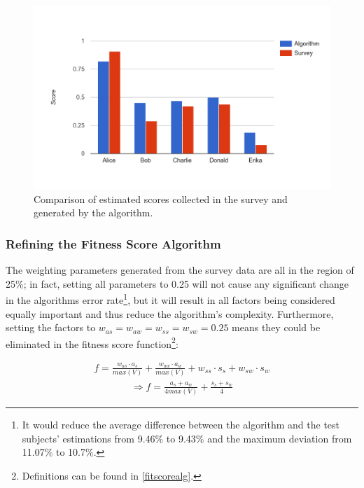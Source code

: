 \begin{figure}[!htp]
    \centering
    \includegraphics[width=\textwidth]{images/survey_vs_alg.png}
    \caption[Diagram: Comparison of Survey and Algorithm]{Comparison of estimated scores collected in the survey and generated by the algorithm.}
    \label{survey:compare}
\end{figure}


\newpage

\subsubsection{Refining the Fitness Score Algorithm}
The weighting parameters generated from the survey data are all in the region of 25\%; in fact, setting all parameters to 0.25 will not cause any significant change in the algorithms error rate\footnote{It would reduce the average difference between the algorithm and the test subjects' estimations from 9.46\% to 9.43\% and the maximum deviation from 11.07\% to 10.7\%.}, but it will result in all factors being considered equally important and thus reduce the algorithm's complexity.
Furthermore, setting the factors to $w_{as} = w_{aw} = w_{ss} = w_{sw} = 0.25$ means they could be eliminated in the fitness score function\footnote{Definitions can be found in \ref{fitscorealg}.}:

\begin{gather*}
  f = \frac{w_{as} \cdot a_s}{max(V)} + \frac{w_{aw} \cdot a_w}{max(V)} + w_{ss} \cdot s_s + w_{sw} \cdot s_w
\end{gather*}
\begin{gather*}
	\Rightarrow f = \frac{a_s + a_w}{4 max(V)} + \frac{s_s + s_w}{4}
\end{gather*}

